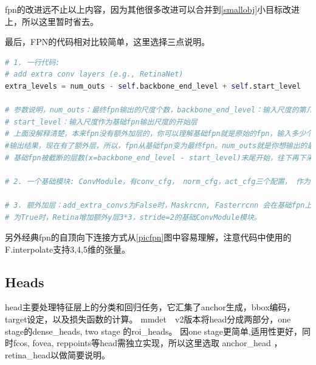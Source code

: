 \documentclass[UTF8]{ctexart}
\begin{document}
fpn的改进远不止以上内容，因为其他很多改进可以合并到\ref{smallobj}小目标改进上，所以这里暂时省去。

最后，FPN的代码相对比较简单，这里选择三点说明。

\lstset{style=mystyle}
\begin{lstlisting}[language=Python]
# 1. 一行代码:
# add extra conv layers (e.g., RetinaNet)
extra_levels = num_outs - self.backbone_end_level + self.start_level

# 参数说明，num_outs：最终fpn输出的尺度个数，backbone_end_level：输入尺度的第几层作为基础fpn输出的最后一层，
# start_level：输入尺度作为基础fpn输出尺度的开始层
# 上面没解释清楚，本来fpn没有额外加层的，你可以理解基础fpn就是原始的fpn，输入多少个层，选一个开始和结束，作为截断就是
#输出结果，现在有了额外层，所以，fpn从基础fpn变为最终fpn。num_outs就是你想输出的最终尺度个数，额外差的尺度特征，从
# 基础fpn被截断的层数(x=backbone_end_level - start_level)末尾开始，往下再下采样y=num_outs-x)即得到最终的fpn特征。

# 2. 一个基础模块: ConvModule，有conv_cfg， norm_cfg，act_cfg三个配置， 作为最小卷积配置单元，注意一下。

# 3. 额外加层：add_extra_convs为False时，Maskrcnn, Fasterrcnn 会在基础fpn上外增加num_outs - used_backbone_levels(x,如上)个max_pool层，
# 为True时，Retina增加额外y层3*3，stride=2的基础ConvModule模块。
\end{lstlisting}

另外经典fpn的自顶向下连接方式从\ref{picfpn}图中容易理解，注意代码中使用的F.interpolate支持3,4,5维的张量。


\subsection{Heads}
head主要处理特征层上的分类和回归任务，它汇集了anchor生成，bbox编码，target设定，以及损失函数的计算。
mmdet　v2版本将head分成两部分，one stage的dense\_heads, two stage 的roi\_heads。
因one stage更简单,适用性更好，同时fcos, fovea, reppoints等head需独立实现，所以这里选取
anchor\_head ，retina\_head以做简要说明。
\end{document}
